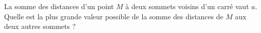 La somme des distances d'un point $M$ à deux sommets voisins d'un carré vaut $a$. Quelle est la plus grande valeur possible de la somme des distances de $M$ aux deux autres sommets ?
